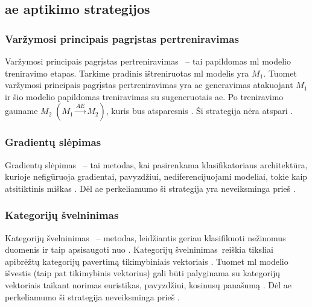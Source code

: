 \subsection{\gls{ae} aptikimo strategijos}\label{sec:literature:defense}

\def\strat{Varžymosi principais pagrįstas pertreniravimas}
\subsubsection{\strat}\label{sec:literature:defense:retraining}

\strat~ -- tai papildomas \gls{ml} modelio treniravimo etapas. Tarkime pradinis ištreniruotas \gls{ml} modelis yra $M_1$. Tuomet \MakeLowercase{\strat} yra \gls{ae} generavimas atakuojant $M_1$ ir šio modelio papildomas treniravimas su sugeneruotais \gls{ae}. Po treniravimo gauname $M_2 \; (M_1 \xrightarrow{AE} M_2)$, kuris bus atsparesnis . Ši strategija nėra atspari  \cite{chakrabortySurveyAdversarialAttacks2021}.



\def\strat{Gradientų slėpimas}
\subsubsection{\strat}

\strat~ -- tai metodas, kai pasirenkama klasifikatoriaus architektūra, kurioje nefigūruoja gradientai, pavyzdžiui, nediferencijuojami modeliai, tokie kaip atsitiktinis miškas . Dėl \gls{ae} perkeliamumo  ši strategija yra neveiksminga prieš  \cite{chakrabortySurveyAdversarialAttacks2021}.



\def\strat{Kategorijų švelninimas}
\subsubsection{\strat}

\strat~ -- metodas, leidžiantis geriau klasifikuoti nežinomus duomenis ir taip apsisaugoti nuo . \strat~reiškia tiksliai apibrėžtų kategorijų  pavertimą tikimybiniais vektoriais . Tuomet \gls{ml} modelio išvestis (taip pat tikimybinis vektorius) gali būti palyginama su kategorijų vektoriais taikant norimas euristikas, pavyzdžiui, kosinusų panašumą . Dėl \gls{ae} perkeliamumo  ši strategija neveiksminga prieš  \cite{chakrabortySurveyAdversarialAttacks2021}.



